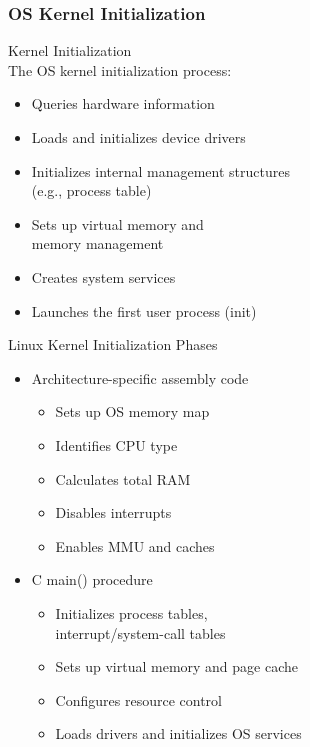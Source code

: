 \multend

\subsubsection{OS Kernel Initialization}


\begin{concept}{Kernel Initialization}\\
    The OS kernel initialization process:
    \begin{itemize}
        \item Queries hardware information 
        \item Loads and initializes device drivers
        \item Initializes internal management structures \\ (e.g., process table)
        \item Sets up virtual memory and \\ memory management
        \item Creates system services
        \item Launches the first user process (init)
    \end{itemize}
\end{concept}

\begin{theorem}{Linux Kernel Initialization Phases}
    \begin{itemize}
        \item Architecture-specific assembly code
            \begin{itemize}
                \item Sets up OS memory map
                \item Identifies CPU type
                \item Calculates total RAM
                \item Disables interrupts
                \item Enables MMU and caches
            \end{itemize}
        \item C main() procedure
            \begin{itemize}
                \item Initializes process tables, \\ interrupt/system-call tables
                \item Sets up virtual memory and page cache
                \item Configures resource control
                \item Loads drivers and initializes OS services
            \end{itemize}
    \end{itemize}
\end{theorem}


